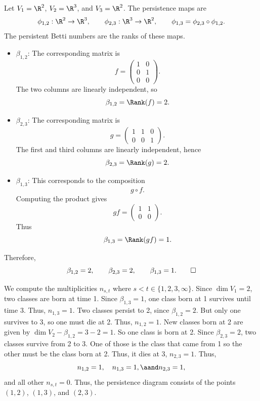\begin{solution}[(i)]
  Let $V_1 = \R^2$, $V_2 = \R^3$, and $V_3 = \R^2$. The persistence maps are
  \[%
    \phi_{1,2} : \R^2 \to \R^3, \qquad \phi_{2,3} : \R^3 \to \R^2, \qquad \phi_{1,3} = \phi_{2,3} \circ \phi_{1,2}
  .\]%
  The persistent Betti numbers are the ranks of these maps.

  \begin{itemize}
    \item $\beta_{1,2}$: The corresponding matrix is
      \[%
        f = \begin{pmatrix}
          1 & 0 \\
          0 & 1 \\
          0 & 0
        \end{pmatrix}
      .\]%
      The two columns are linearly independent, so
      \[%
        \beta_{1,2} = \Rank(f) = 2
      .\]%
    \item $\beta_{2,3}$: The corresponding matrix is
      \[%
        g = \begin{pmatrix}
          1 & 1 & 0 \\
          0 & 0 & 1
        \end{pmatrix}
      .\]%
      The first and third columns are linearly independent, hence
      \[%
        \beta_{2,3} = \Rank(g) = 2
      .\]%
    \item $\beta_{1,3}$: This corresponds to the composition
      \[%
        g \circ f
      .\]%
      Computing the product gives
      \[%
        g f = \begin{pmatrix}
          1 & 1 \\
          0 & 0
        \end{pmatrix}
      .\]%
      Thus
      \[%
        \beta_{1,3} = \Rank(gf) = 1
      .\]%
  \end{itemize}
  Therefore,
  \[%
    \beta_{1,2} = 2, \qquad \beta_{2,3} = 2, \qquad \beta_{1,3} = 1
  .\qedhere\]%
\end{solution}

\begin{solution}[(ii)]
  We compute the multiplicities $n_{s,t}$ where $s < t \in \{1, 2, 3, \infty\}$. Since $\dim V_1 = 2$, two classes are born at time 1. Since $\beta_{1,3} = 1$, one class born at 1 survives until time 3. Thus, $n_{1,3} = 1$. Two classes persist to 2, since $\beta_{1,2} = 2$. But only one survives to 3, so one must die at 2. Thus, $n_{1,2} = 1$. New classes born at 2 are given by $\dim V_2 - \beta_{1,2} = 3 - 2 = 1$. So one class is born at 2. Since $\beta_{2,3} = 2$, two classes survive from 2 to 3. One of those is the class that came from 1 so the other must be the class born at 2. Thus, it dies at 3, $n_{2,3} = 1$. Thus,
  \[%
    n_{1,2} = 1, \quad n_{1,3} = 1, \aand n_{2,3} = 1
  ,\]%
  and all other $n_{s,t} = 0$. Thus, the persistence diagram consists of the points $(1, 2)$, $(1, 3)$, and $(2, 3)$.
\end{solution}

